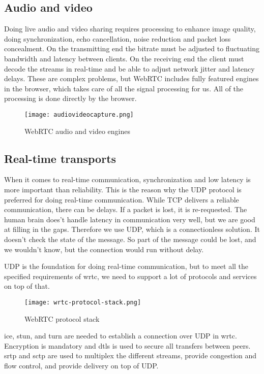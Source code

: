 \subsection{Audio and video}
Doing live audio and video sharing requires processing to enhance image quality, doing synchronization, echo cancellation, noise reduction and packet loss concealment\cite{grigorik_high_2013}. On the transmitting end the bitrate must be adjusted to fluctuating bandwidth and latency between clients. On the receiving end the client must decode the streams in real-time and be able to adjust network jitter and latency delays. These are complex problems, but WebRTC includes fully featured engines in the browser, which takes care of all the signal processing for us. All of the processing is done directly by the browser.

\begin{figure}[here]
\centerline{\texttt{[image: audiovideocapture.png]}}
\caption{WebRTC audio and video engines}
\label{fig:audiovideocapture}
\end{figure}

\subsection{Real-time transports}
When it comes to real-time communication, synchronization and low latency is more important than reliability. This is the reason why the UDP protocol is preferred for doing real-time communication. While TCP delivers a reliable communication, there can be delays. If a packet is lost, it is re-requested. The human brain does't handle latency in communication very well, but we are good at filling in the gaps. Therefore we use UDP, which is a connectionless solution. It doesn't check the state of the message. So part of the message could be lost, and we wouldn't know, but the connection would run without delay.

UDP is the foundation for doing real-time communication, but to meet all the specified requirements of \gls{wrtc}, we need to support a lot of protocols and services on top of that.

\begin{figure}[here]
\centerline{\texttt{[image: wrtc-protocol-stack.png]}}
\caption{WebRTC protocol stack}
\label{fig:wrtc-protocol-stack}
\end{figure}

\gls{ice}, \gls{stun}, and \gls{turn} are needed to establish a connection over UDP in \gls{wrtc}. Encryption is mandatory and \gls{dtls} is used to secure all transfers between peers. \gls{srtp} and \gls{sctp} are used to multiplex the different streams, provide congestion and flow control, and provide delivery on top of UDP.

